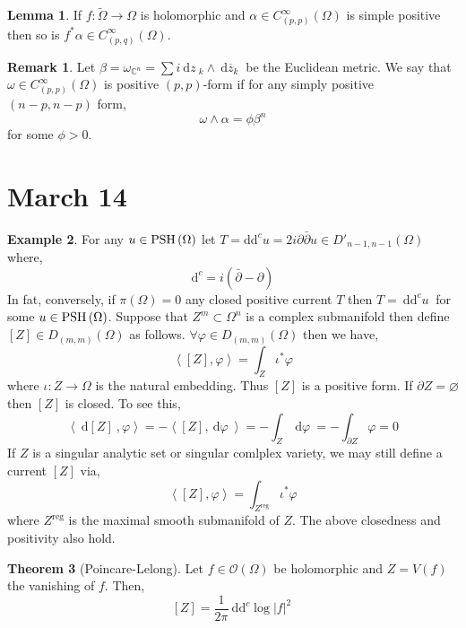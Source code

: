 \documentclass[12pt]{extarticle}
\newcommand{\C}{\mathbb{C}}
\renewcommand{\d}[1]{\: \mathrm{d}#1 \:}
\theoremstyle{definition}
\newtheorem{theorem}{Theorem}[section]
\newtheorem{lemma}[theorem]{Lemma}
\newtheorem{example}[theorem]{Example}
\newtheorem{remark}{Remark}
\begin{document}
\begin{lemma}
If $f : \tilde{\Omega} \to \Omega$ is holomorphic and $\alpha \in C^\infty_{(p,p)}(\Omega)$ is simple positive then so is $f^* \alpha \in C^\infty_{(p,q)}(\Omega)$.
\end{lemma}

\begin{remark}
Let $\beta = \omega_{\C^n} = \sum i \d{z}_k \wedge \d{\overline{z}_k}$ be the Euclidean metric. We say that $\omega \in C^\infty_{(p,p)}(\Omega)$ is  positive $(p,p)$-form if for any simply positive $(n-p, n-p)$ form,
\[ \omega \wedge \alpha = \phi \beta^n \]
for some $\phi > 0$. 
\end{remark}

\section{March 14}

\newcommand{\dc}{\mathrm{d}^c}
\newcommand{\inner}[2]{\left< #1, #2 \right>}

\begin{example}
For any $u \in \mathrm{PSH}\left( \Omega \right)$ let $T = \mathrm{d}\mathrm{d}^c u = 2 i \partial \bar{\partial} u \in D'_{n-1, n-1}(\Omega)$ where,
\[ \dc = i \left( \bar{\partial} - \partial \right) \]
In fat, conversely, if $\pi(\Omega) = 0$ any closed positive current $T$ then $T = \d{\dc u}$ for some $u \in \mathrm{PSH}\left( \Omega \right)$. Suppose that $Z^m \subset \Omega^n$ is a complex submanifold then define $[Z] \in D_{(m,m)}(\Omega)$ as follows. $\forall \varphi \in D_{(m,m)}(\Omega)$ then we have,
\[ \inner{[Z]}{\varphi} = \int_{Z} \iota^* \varphi \]
where $\iota : Z \to \Omega$ is the natural embedding. Thus $[Z]$ is a positive form. If $\partial Z = \varnothing$ then $[Z]$ is closed. To see this,
\[ \inner{\d{[Z]}}{\varphi} = - \inner{[Z]}{\d{\varphi}} = - \int_Z \d{\varphi} = - \int_{\partial Z} \varphi = 0 \]
If $Z$ is a singular analytic set or singular comlplex variety, we may still define a current $[Z]$ via,
\[ \inner{[Z]}{\varphi} = \int_{Z^\text{reg}} \iota^* \varphi \]
where $Z^{\text{reg}}$ is the maximal smooth submanifold of $Z$. The above closedness and positivity also hold. 
\end{example}

\begin{theorem}[Poincare-Lelong]
Let $f \in \mathcal{O}(\Omega)$ be holomorphic and $Z = V(f)$ the vanishing of $f$. Then,
\[ [Z] = \frac{1}{2 \pi} \d{\dc \log{|f|^2}} \]
\end{theorem}
\end{document}
